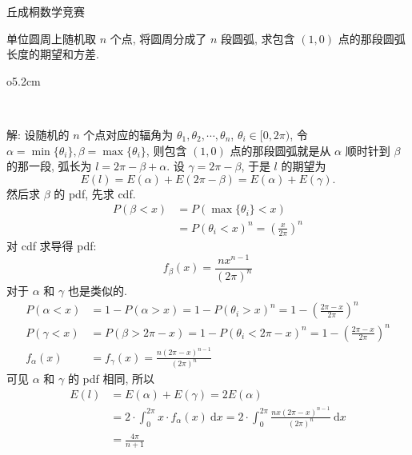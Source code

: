  丘成桐数学竞赛

单位圆周上随机取 $n$ 个点, 将圆周分成了 $n$ 段圆弧, 求包含 $(1,0)$ 点的那段圆弧长度的期望和方差.

\begin{wrapfigure}{o}{5.2cm}
\end{wrapfigure}

~

解: 设随机的 $n$ 个点对应的辐角为 $\theta_1, \theta_2, \cdots, \theta_n$, $\theta_i\in[0,2\pi)$, 令 $\alpha = \min\{\theta_i\}, \beta = \max\{\theta_i\}$, 则包含 $(1,0)$ 点的那段圆弧就是从 $\alpha$ 顺时针到 $\beta$ 的那一段, 弧长为 $l = 2\pi - \beta + \alpha$. 设 $\gamma = 2\pi - \beta$, 
于是 $l$ 的期望为 
\[E(l) = E(\alpha) + E(2\pi - \beta) = E(\alpha) + E(\gamma).\]
然后求 $\beta$ 的 pdf, 先求 cdf. 
\begin{align*}
P(\beta < x) &= P(\max\{\theta_i\} < x) \\
&= P(\theta_i < x)^n = \left(\frac{x}{2\pi}\right)^n 
\end{align*}
对 cdf 求导得 pdf:
\[ f_\beta(x) = \frac{nx^{n-1}}{(2\pi)^n} \]
对于 $\alpha$ 和 $\gamma$ 也是类似的.
\begin{align*}
P(\alpha < x) &= 1 - P(\alpha > x) = 1 - P(\theta_i > x)^n = 1 - \left(\frac{2\pi - x}{2\pi}\right)^n \\
P(\gamma < x) &= P(\beta > 2\pi - x) = 1 - P(\theta_i < 2\pi - x)^n = 1 - \left(\frac{2\pi - x}{2\pi}\right)^n \\
f_\alpha(x) &= f_\gamma(x) = \frac{n(2\pi-x)^{n-1}}{(2\pi)^n}
\end{align*}
可见 $\alpha$ 和 $\gamma$ 的 pdf 相同, 所以
\begin{align*}
E(l) &= E(\alpha) + E(\gamma) = 2E(\alpha) \\
&=2\cdot \int_0^{2\pi} x\cdot f_\alpha(x)\ \mathrm{d}x = 2\cdot \int_0^{2\pi} \frac{nx(2\pi - x)^{n-1}}{(2\pi)^n}\ \mathrm{d}x \\
&= \frac{4\pi}{n+1}
\end{align*}

